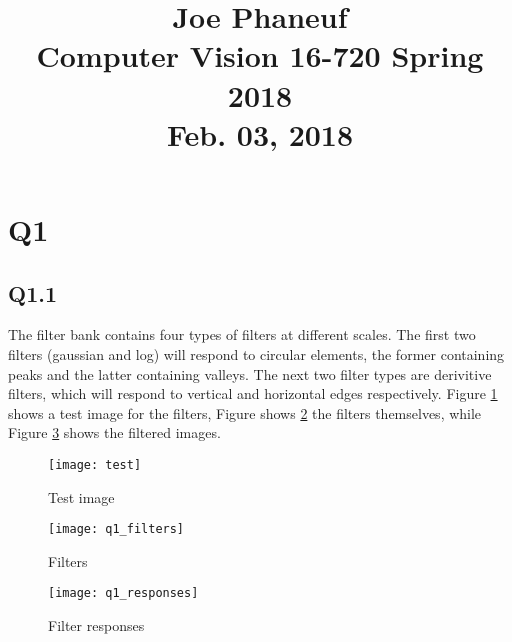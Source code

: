 \documentclass[12pt]{article}
\begin{document}
\title{Joe Phaneuf \\ Computer Vision 16-720 Spring 2018 \\ Feb. 03, 2018 }
\date{}
\author{}
\maketitle

\newpage


\section{Q1}
\subsection{Q1.1}

The filter bank contains four types of filters at different scales. The first two filters (gaussian and log) will respond to circular elements, the former containing peaks and the latter containing valleys.
The next two filter types are derivitive filters, which will respond to vertical and horizontal edges respectively.
Figure \ref{fig:test_image} shows a test image for the filters, Figure shows \ref{fig:filters} the filters themselves, while Figure \ref{fig:filter_responses} shows the filtered images.

\begin{figure}[H]
\centering
\texttt{[image: test]}
\caption{Test image}    
\label{fig:test_image}
\end{figure}   

\begin{figure}[H]
\centering
\texttt{[image: q1\_filters]}
\caption{Filters}    
\label{fig:filters}
\end{figure}   

\begin{figure}[H]
\centering
\texttt{[image: q1\_responses]}
\caption{Filter responses}    
\label{fig:filter_responses}
\end{figure}   

\newpage
\end{document}
